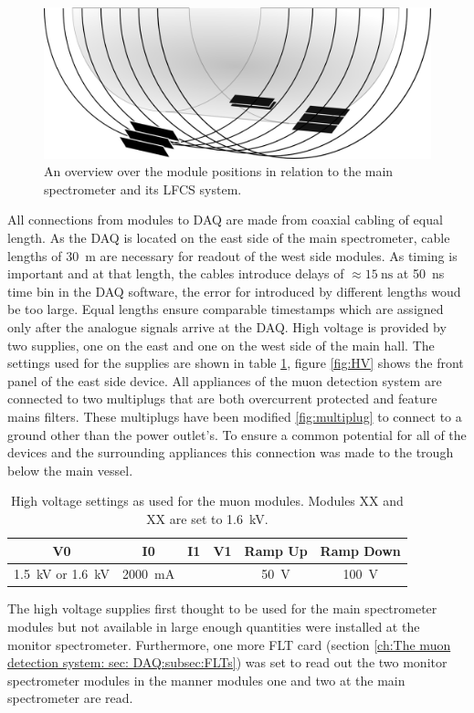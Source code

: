   \begin{figure}
  	\centering
  	\includegraphics[width = 0.9 \textwidth]{graphics/muonModules/mainSpec/panelsMainSpec.png}
  	\caption[Module locations]{An overview over the module positions in relation to the main spectrometer and its LFCS system. }
  \end{figure}
  All connections from modules to DAQ are made from coaxial cabling of equal length. As the DAQ is located on the east side of the main spectrometer, cable lengths of \SI{30}{\meter} are necessary for readout of the west side modules. As timing is important and at that length, the cables introduce delays of $\approx \SI{15}{\nano\second}$ at \SI{50}{\nano\second} time bin in the DAQ software, the error for introduced by different lengths woud be too large. Equal lengths ensure comparable timestamps which are assigned only after the analogue signals arrive at the DAQ. High voltage is provided by two supplies, one on the east and one on the west side of the main hall. The settings used for the supplies are shown in table  \ref{tab:HVSettings}, figure \ref{fig:HV} shows the front panel of the east side device.
  All appliances of the muon detection system are connected to two multiplugs that are both overcurrent protected and feature mains filters. These multiplugs have been modified \ref{fig:multiplug} to connect to a ground other than the power outlet's. To ensure a common potential for all of the devices and the surrounding appliances this connection was made to the trough below the main vessel.
  \begin{table}
  \centering
  	\begin{tabular}{|c|c|c|c|c|c|}
  	\hline
  		V0 & I0 & I1 & V1 & Ramp Up & Ramp Down\\
  		\hline
  		\SI{1.5}{\kilo\volt} or \SI{1.6}{\kilo\volt} & \SI{2000}{\milli\ampere} & & & \SI{50}{\volt} & \SI{100}{\volt}\\
  		\hline
  	\end{tabular}
  	\caption[High voltage settings]{High voltage settings as used for the muon modules. Modules XX and XX are set to \SI{1.6}{\kilo\volt}.}
  	\label{tab:HVSettings}
  \end{table}
  The high voltage supplies first thought to be used for the main spectrometer modules but not available in large enough quantities were installed at the monitor spectrometer. Furthermore, one more FLT card (section \ref{ch:The muon detection system: sec: DAQ:subsec:FLTs}) was set to read out the two monitor spectrometer modules in the manner modules one and two at the main spectrometer are read.

